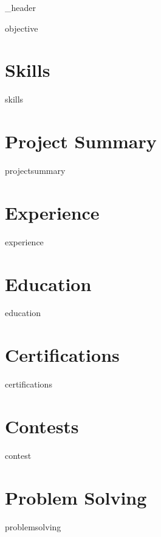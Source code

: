 \documentclass[letter,10pt]{article}
\author{Omar Faruk Pial} %
\begin{document}
{_header}

{objective}
\vspace*{7pt}

\section{Skills}
\vspace*{3pt}
{skills}
\vspace*{7pt}

\section{Project Summary}
\vspace*{3pt}
{projectsummary}
\vspace*{7pt}

\section{Experience}
{experience}
\vspace*{7pt}

\section{Education}
{education}
\vspace*{7pt}

\section{Certifications}
{certifications}
\vspace*{7pt}


\section{Contests}
{contest}
\vspace*{7pt}

\section{Problem Solving}
{problemsolving}
\vspace*{7pt}

\end{document}
